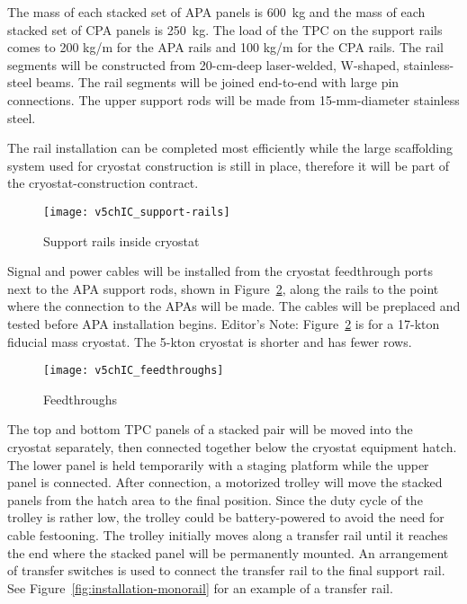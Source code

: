 The mass of each stacked set of APA panels is 600~kg and the mass of each stacked set of CPA panels is 250~kg. The load of the TPC on the support rails comes to 200 kg/m for the APA rails and 100 kg/m for the CPA rails. The rail segments will be constructed from 20-cm-deep laser-welded, W-shaped, stainless-steel beams. The rail segments will be joined end-to-end with large pin connections. The upper support rods will be made from 15-mm-diameter stainless steel.

The rail installation can be completed most efficiently while the large scaffolding system used for cryostat construction is still in place, therefore it will be part of the cryostat-construction contract. 

\begin{figure}[htbp]
\centering
\texttt{[image: v5chIC\_support-rails]}
\caption{Support rails inside cryostat} 
\label{fig:support-rails}
\end{figure}

Signal and power cables will be installed from the cryostat feedthrough ports next to the APA support rods, shown in Figure~\ref{fig:feedthroughs}, along the rails to the point where the connection to the APAs will be made. The cables will be preplaced and tested before APA installation begins. 
\notestart Editor's Note: Figure~\ref{fig:feedthroughs} is for a 17-kton fiducial mass cryostat. The 5-kton cryostat is
shorter and has fewer rows.\notestop



\begin{figure}[htbp]
\centering
\texttt{[image: v5chIC\_feedthroughs]}
\caption{Feedthroughs }
\label{fig:feedthroughs}
\end{figure}

The top and bottom TPC panels of a stacked pair will be moved into the cryostat separately, then connected together below the cryostat equipment hatch. The lower panel is held temporarily with a staging platform while the upper panel is connected.  After connection, a motorized trolley will move the stacked panels from the hatch area to the final position. Since the duty cycle of the trolley is rather low, the trolley could be battery-powered to avoid the need for cable festooning. The trolley initially moves along a transfer rail until it reaches the end where the stacked panel will be permanently mounted. An arrangement of transfer switches is used to connect the transfer rail to the final support rail. See Figure~\ref{fig:installation-monorail} for an example of a transfer rail.


